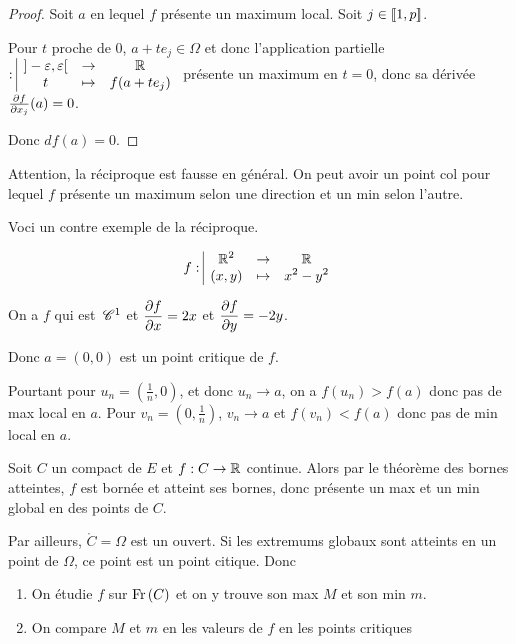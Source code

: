 \begin{proof}
    Soit $a$ en lequel $f$ présente un maximum local. Soit $j \in [\![1, p]\!]$. 

    Pour $t$ proche de 0, $a + t e_j \in \Omega$ et donc l'application
    partielle $: \space \begin{array}{|ccc} \displaystyle ]- \varepsilon, \varepsilon[ & \to & \displaystyle \mathbb{R} \\ \displaystyle t & \mapsto & \displaystyle f(a + t e_j) \end{array}$ présente un maximum en $t = 0$, donc
    sa dérivée $\frac{\partial f}{\partial x_j} (a) = 0$.

    Donc $df(a) = 0$.
\end{proof}

Attention, la réciproque est fausse en général. On peut avoir un point col pour 
lequel $f$ présente un maximum selon une direction et un min selon l'autre. 


\begin{exemple}
    Voci un contre exemple de la réciproque. 

    $$f: \space \begin{array}{|ccc} \displaystyle \mathbb{R}^2 & \to & \displaystyle \mathbb{R} \\ \displaystyle (x, y) & \mapsto & \displaystyle x^2 - y^2 \end{array}$$
    
    On a $f$ qui est $\,\mathscr C^{1}$ et 
    $\displaystyle \frac{\partial f}{\partial x} = 2x$ et $\displaystyle \frac{\partial f}{\partial y} = -2y$.

    Donc $a = (0, 0)$ est un point critique de $f$.

    Pourtant pour $u_n = \left( \frac 1 n, 0 \right)$, et donc $u_n \to a$, on a 
    $f(u_n) > f(a)$ donc pas de max local en $a$. Pour $v_n = \left( 0, \frac 1 n \right)$,
    $v_n \to a$ et $f(v_n) < f(a)$ donc pas de min local en $a$.
\end{exemple}


Soit $C$ un compact de $E$ et $f : C \to \mathbb{R}$ continue. Alors par le théorème des bornes atteintes, 
$f$ est bornée et atteint ses bornes, donc présente un max et un min global en des points de $C$. 

Par ailleurs, $\mathring C = \Omega$ est un ouvert. Si les extremums globaux sont atteints en un point 
de $\Omega$, ce point est un point citique. Donc 
\begin{enumerate}
    \item On étudie $f$ sur $\operatorname{Fr} \,(C)$ et on y trouve son max $M$ et son min $m$.
    \item On compare $M$ et $m$ en les valeurs de $f$ en les points critiques
\end{enumerate}

